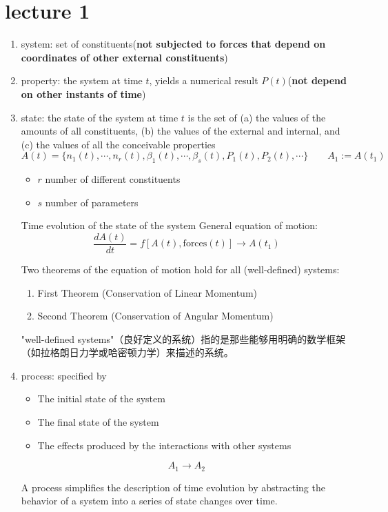 \section{lecture 1}
\begin{defn}
\par\indent
\begin{enumerate}
    \item \textcolor{b1}{system}:\;
    set of constituents\;(\textbf{not subjected to forces that depend on coordinates of other external constituents})
    \item \textcolor{b1}{property}:\; 
    the system at time \( t \), yields a numerical result \( P(t) \)\;(\textbf{not depend on other instants of time})
    \item \textcolor{b1}{state}:\; 
    the state of the system at time \( t \) is the set of
     (a) the values of the amounts of all constituents,
     (b) the values of the external and internal, and
     (c) the values of all the conceivable properties
\[ A(t) = \{ n_1(t), \cdots, n_r(t), \beta_1(t), \cdots, \beta_s(t), P_1(t), P_2(t), \cdots \} 
\qquad A_1:=A(t_1)\]
\begin{itemize}
    \item \( r\) number of different constituents
    \item \( s\) number of parameters
\end{itemize}
\begin{add}
    Time evolution of the state of the system
    General equation of motion:
\[ \frac{dA(t)}{dt} = f[A(t), \text{forces}(t)] \rightarrow A(t_1)\]

Two theorems of the equation of motion hold for all (well-defined) systems:
\begin{enumerate}
\item First Theorem (Conservation of Linear Momentum)
\item Second Theorem (Conservation of Angular Momentum)
\end{enumerate}
\begin{zhu}
    "well-defined systems"（良好定义的系统）指的是那些能够用明确的数学框架（如拉格朗日力学或哈密顿力学）来描述的系统。
\end{zhu}
\end{add}
    \item \textcolor{b1}{process}:\; 
    specified by
    \begin{itemize}
    \item The initial state of the system
    \item The final state of the system
    \item The effects produced by the interactions with other systems
    \end{itemize}
    \[ A_1 \rightarrow A_2 \]
    \begin{zhu}
        A process simplifies the description of time evolution by abstracting the behavior of a system 
        into a series of state changes over time. 
        

\end{zhu}
\end{enumerate}
\end{defn}
